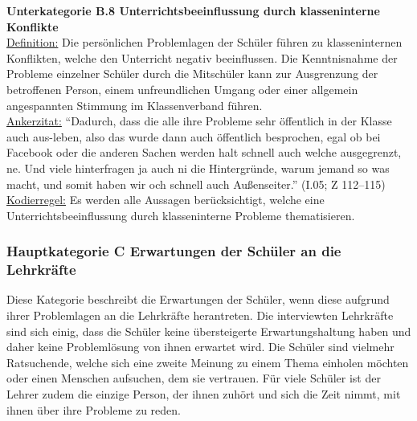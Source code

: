 \noindent
\textbf{Unterkategorie B.8 Unterrichtsbeeinflussung durch klasseninterne Konflikte}\\
\underline{Definition:} Die persönlichen Problemlagen der Schüler führen zu klasseninternen Konflikten, welche den Unterricht negativ beeinflussen. Die Kenntnisnahme der Probleme einzelner Schüler durch die Mitschüler kann zur Ausgrenzung der betroffenen Person, einem unfreundlichen Umgang oder einer allgemein angespannten Stimmung im Klassenverband führen.\\
\underline{Ankerzitat:} "`Dadurch, dass die alle ihre Probleme sehr öffentlich in der Klasse auch aus-leben, also das wurde dann auch öffentlich besprochen, egal ob bei Facebook oder die anderen Sachen werden halt schnell auch welche ausgegrenzt, ne. Und viele hinterfragen ja auch ni die Hintergründe, warum jemand so was macht, und somit haben wir och schnell auch Außenseiter."' (I.05; Z 112--115)\\
\underline{Kodierregel:} Es werden alle Aussagen berücksichtigt, welche eine Unterrichtsbeeinflussung durch klasseninterne Probleme thematisieren.

\subsubsection{Hauptkategorie C Erwartungen der Schüler an die Lehrkräfte}
\label{sec:HauptkategorieCErwartungenDerSchülerAnDieLehrkräfte}

Diese Kategorie beschreibt die Erwartungen der Schüler, wenn diese aufgrund ihrer Problemlagen an die Lehrkräfte herantreten. Die interviewten Lehrkräfte sind sich einig, dass die Schüler keine übersteigerte Erwartungshaltung haben und daher keine Problemlösung von ihnen erwartet wird. Die Schüler sind vielmehr Ratsuchende, welche sich eine zweite Meinung zu einem Thema einholen möchten oder einen Menschen aufsuchen, dem sie vertrauen. Für viele Schüler ist der Lehrer zudem die einzige Person, der ihnen zuhört und sich die Zeit nimmt, mit ihnen über ihre Probleme zu reden.\\

